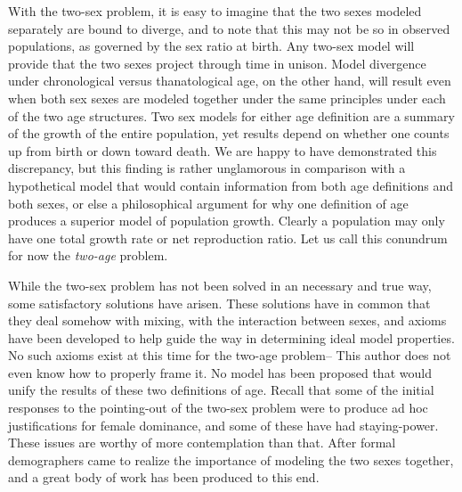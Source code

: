 With the two-sex problem, it is easy to imagine that the two sexes modeled
separately are bound to diverge, and to note that this may not be so in
observed populations, as governed by the sex ratio at birth. Any two-sex
model will provide that the two sexes project through time in unison. Model
divergence under chronological versus thanatological age, on the other hand,
will result even when both sex sexes are modeled together under the same principles under each
of the two age structures. Two sex models for either age definition are a
summary of the growth of the entire population, yet results depend on whether
one counts up from birth or down toward death. We are happy to have demonstrated
this discrepancy, but this finding is rather unglamorous in comparison with a
hypothetical model that would contain information from both age definitions and
both sexes, or else a philosophical argument for why one definition of age
produces a superior model of population growth. Clearly a population may only
have one total growth rate or net reproduction ratio. Let us call this conundrum 
for now the \textit{two-age} problem.

While the two-sex problem has not been solved in an necessary and true way, some
satisfactory solutions have arisen. These solutions have in common that they
deal somehow with mixing, with the interaction between sexes, and axioms have
been developed to help guide the way in determining ideal model properties. No
such axioms exist at this time for the two-age problem-- This author does not
even know how to properly frame it. No model has been proposed
that would unify the results of these two definitions of age. Recall that some 
of the initial responses to the pointing-out of the two-sex problem
were to produce ad hoc justifications for female dominance, and some of these
have had staying-power. These issues are worthy of more contemplation than that.
After \citet{karmel1947relations} formal demographers came to realize the
importance of modeling the two sexes together, and a great body 
of work has been produced to this end. 

\FloatBarrier